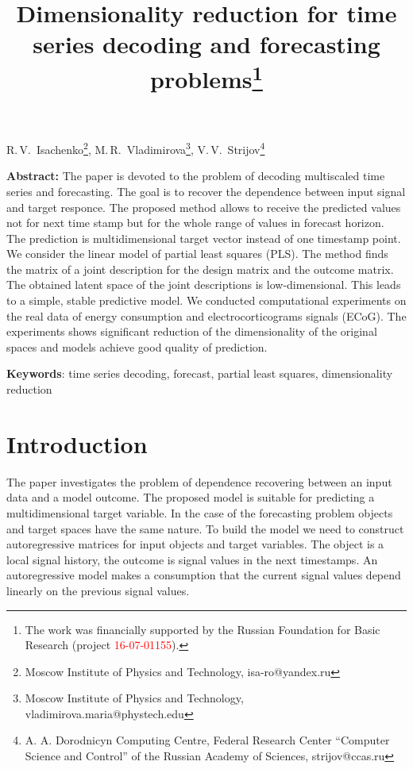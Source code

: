 \documentclass[12pt,twoside]{article}
\begin{document}
	\title
	{Dimensionality reduction for time series decoding and forecasting problems\thanks{The work was financially supported by the Russian Foundation for Basic Research (project \textcolor{red}{16-07-01155}).}}
	\date{}
	\maketitle
	\begin{center}
		R.\,V.~Isachenko\footnote{Moscow Institute of Physics and Technology, isa-ro@yandex.ru},
		M.\,R.~Vladimirova\footnote{Moscow Institute of Physics and Technology, vladimirova.maria@phystech.edu},
		V.\,V.~Strijov\footnote{A. A. Dorodnicyn Computing Centre, Federal Research Center “Computer Science and Control” of the Russian Academy of Sciences, strijov@ccas.ru}
	\end{center}
	\textbf{Abstract:} 
	The paper is devoted to the problem of decoding multiscaled time series and forecasting.
	The goal is to recover the dependence between input signal and target responce.
	The proposed method allows to receive the predicted values not for next time stamp but for the whole range of values in forecast horizon.
	The prediction is multidimensional target vector instead of one timestamp point. 
	We consider the linear model of partial least squares (PLS).
	The method finds the matrix of a joint description for the design matrix and the outcome matrix.
	The obtained latent space of the joint descriptions is low-dimensional.
	This leads to a simple, stable predictive model.
	We conducted computational experiments on the real data of energy consumption and electrocorticograms signals (ECoG). 
	The experiments shows significant reduction of the dimensionality of the original spaces and models achieve good quality of prediction.
	
	\bigskip
	\textbf{Keywords}: time series decoding, forecast, partial least squares, dimensionality reduction

\linenumbers
\section{Introduction}

The paper investigates the problem of dependence recovering between an input data and a model outcome.
The proposed model is suitable for predicting a multidimensional target variable.
In the case of the forecasting problem objects and target spaces have the same nature.
To build the model we need to construct autoregressive matrices for input objects and target variables.
The object is a local signal history, the outcome is signal values in the next timestamps.
An autoregressive model makes a consumption that the current signal values depend linearly on the previous signal values.
\end{document}
